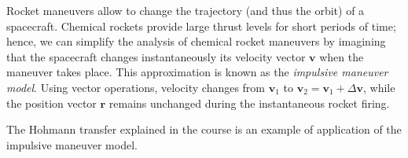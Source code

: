 Rocket maneuvers allow to change the trajectory (and thus the orbit) of a
spacecraft. Chemical rockets provide large thrust levels for short periods of
time; hence, we can simplify the analysis of chemical rocket maneuvers by
imagining that the spacecraft changes instantaneously its velocity vector $\bm
v$ when the maneuver takes place. This approximation is known as the
\emph{impulsive maneuver model}. Using vector operations,  velocity changes
from $\bm v_1$ to $\bm v_2=\bm v_1 + \Delta \bm v$, while  the position vector
$\bm r$ remains unchanged during the instantaneous rocket firing.

The Hohmann transfer explained in the course is an example of application
of the impulsive maneuver model.